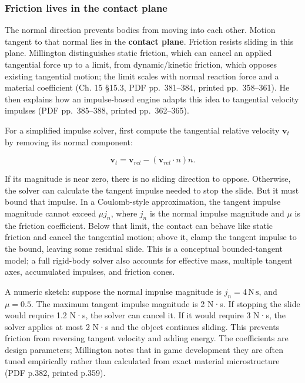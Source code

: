 \subsubsection{Friction lives in the contact plane}\label{friction-lives-in-the-contact-plane}

The normal direction prevents bodies from moving into each other. Motion tangent to that normal lies in the \textbf{contact plane}. Friction resists sliding in this plane. Millington distinguishes static friction, which can cancel an applied tangential force up to a limit, from dynamic/kinetic friction, which opposes existing tangential motion; the limit scales with normal reaction force and a material coefficient (Ch. 15 §15.3, PDF pp.~381--384, printed pp.~358--361). He then explains how an impulse-based engine adapts this idea to tangential velocity impulses (PDF pp.~385--388, printed pp.~362--365).

For a simplified impulse solver, first compute the tangential relative velocity \(\mathbf{v}_t\) by removing its normal component:

\[
\mathbf{v}_t=\mathbf{v}_{rel}-(\mathbf{v}_{rel}\cdot n)n.
\]

If its magnitude is near zero, there is no sliding direction to oppose. Otherwise, the solver can calculate the tangent impulse needed to stop the slide. But it must bound that impulse. In a Coulomb-style approximation, the tangent impulse magnitude cannot exceed \(\mu j_n\), where \(j_n\) is the normal impulse magnitude and \(\mu\) is the friction coefficient. Below that limit, the contact can behave like static friction and cancel the tangential motion; above it, clamp the tangent impulse to the bound, leaving some residual slide. This is a conceptual bounded-tangent model; a full rigid-body solver also accounts for effective mass, multiple tangent axes, accumulated impulses, and friction cones.

A numeric sketch: suppose the normal impulse magnitude is \(j_n=4\,\mathrm{N\,s}\), and \(\mu=0.5\). The maximum tangent impulse magnitude is 2 N·s. If stopping the slide would require 1.2 N·s, the solver can cancel it. If it would require 3 N·s, the solver applies at most 2 N·s and the object continues sliding. This prevents friction from reversing tangent velocity and adding energy. The coefficients are design parameters; Millington notes that in game development they are often tuned empirically rather than calculated from exact material microstructure (PDF p.382, printed p.359).

